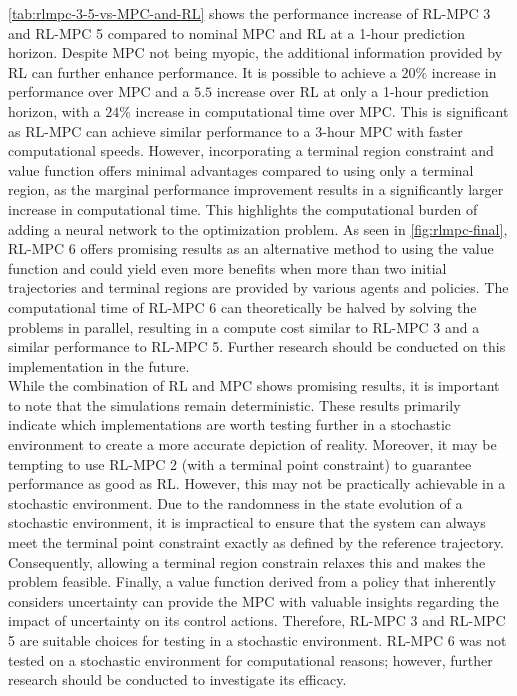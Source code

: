 \autoref{tab:rlmpc-3-5-vs-MPC-and-RL} shows the performance increase of RL-MPC 3 and RL-MPC 5 compared to nominal MPC and RL at a 1-hour prediction horizon. Despite MPC not being myopic, the additional information provided by RL can further enhance performance. It is possible to achieve a $20\%$ increase in performance over MPC and a $5.5$ increase over RL at only a 1-hour prediction horizon, with a $24\%$ increase in computational time over MPC. This is significant as RL-MPC can achieve similar performance to a 3-hour MPC with faster computational speeds. However, incorporating a terminal region constraint and value function offers minimal advantages compared to using only a terminal region, as the marginal performance improvement results in a significantly larger increase in computational time. This highlights the computational burden of adding a neural network to the optimization problem. As seen in \autoref{fig:rlmpc-final}, RL-MPC 6 offers promising results as an alternative method to using the value function and could yield even more benefits when more than two initial trajectories and terminal regions are provided by various agents and policies. The computational time of RL-MPC 6 can theoretically be halved by solving the problems in parallel, resulting in a compute cost similar to RL-MPC 3 and a similar performance to RL-MPC 5. Further research should be conducted on this implementation in the future.\\

While the combination of RL and MPC shows promising results, it is important to note that the simulations remain deterministic. These results primarily indicate which implementations are worth testing further in a stochastic environment to create a more accurate depiction of reality. Moreover, it may be tempting to use RL-MPC 2 (with a terminal point constraint) to guarantee performance as good as RL. However, this may not be practically achievable in a stochastic environment. Due to the randomness in the state evolution of a stochastic environment, it is impractical to ensure that the system can always meet the terminal point constraint exactly as defined by the reference trajectory. Consequently, allowing a terminal region constrain relaxes this and makes the problem feasible. Finally, a value function derived from a policy that inherently considers uncertainty can provide the MPC with valuable insights regarding the impact of uncertainty on its control actions. Therefore, RL-MPC 3 and RL-MPC 5 are suitable choices for testing in a stochastic environment. RL-MPC 6 was not tested on a stochastic environment for computational reasons; however, further research should be conducted to investigate its efficacy.

